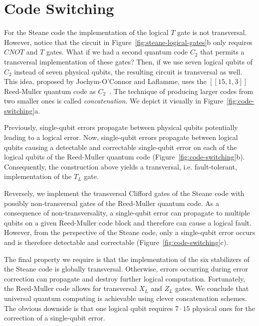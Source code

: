 \section{Code Switching}\label{sec:code-switching}



For the Steane code the implementation of the logical $T$ gate is not transversal. However, notice that the circuit in Figure~\ref{fig:steane-logical-gates}b only requires $CNOT$ and $T$ gates. What if we had a second quantum code $C_{2}$ that permits a transversal implementation of these gates? Then, if we use seven logical qubits of $C_{2}$ instead of seven physical qubits, the resulting circuit is transversal as well. This idea, proposed by {Jochym-O'Connor} and Laflamme, uses the $[[15,1,3]]$ {Reed-Muller} quantum code as $C_{2}$~\cite{jochym-oconnor_using_2014}. The technique of producing larger codes from two smaller ones is called \textit{concatenation}. We depict it visually in Figure~\ref{fig:code-switching}a.

\smallskip
\noindent
Previously, single-qubit errors propagate between physical qubits potentially leading to a logical error. Now, single-qubit errors propagate between logical qubits causing a detectable and correctable single-qubit error on each of the logical qubits of the Reed-Muller quantum code (Figure~\ref{fig:code-switching}b). Consequently, the construction above yields a transversal, i.e. fault-tolerant, implementation of the $T_{L}$ gate. 

Reversely, we implement the transversal Clifford gates of the Steane code with possibly non-transversal gates of the {Reed-Muller} quantum code. As a consequence of non-transversality, a single-qubit error can propagate to multiple qubits on a given {Reed-Muller} code block and therefore can cause a logical fault. However, from the perspective of the Steane code, only a single-qubit error occurs and is therefore detectable and correctable (Figure~\ref{fig:code-switching}c).

\smallskip
\noindent
The final property we require is that the implementation of the six stabilizers of the Steane code is globally transversal. Otherwise, errors occurring during error correction can propagate and destroy further logical computation. Fortunately, the Reed-Muller code allows for transversal $X_L$ and $Z_L$ gates. We conclude that universal quantum computing is achievable using clever concatenation schemes. The obvious downside is that one logical qubit requires $7\cdot{}15$ physical ones for the correction of a single-qubit error.